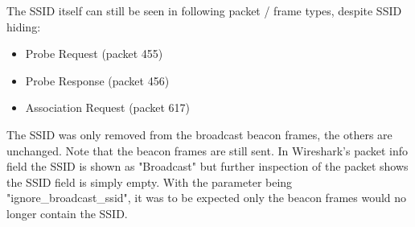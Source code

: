 The SSID itself can still be seen in following packet / frame types, despite SSID hiding:
\begin{itemize}
\item Probe Request (packet 455)
\item Probe Response (packet 456)
\item Association Request (packet 617)
\end{itemize}
The SSID was only removed from the broadcast beacon frames, the others are unchanged. Note that the beacon frames are still sent. In Wireshark's packet info field the SSID is shown as "Broadcast" but further inspection of the packet shows the SSID field is simply empty.
With the parameter being "ignore\_broadcast\_ssid", it was to be expected only the beacon frames would no longer contain the SSID.
